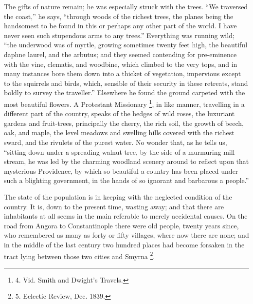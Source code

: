 The gifts of nature remain; he
was especially struck with the trees. ``We traversed the coast,'' he
says, ``through woods of the richest trees, the planes being the
handsomest to be found in this or perhaps any other part of the world.
I have never seen such stupendous arms to any trees.'' Everything was
running wild; ``the underwood was of myrtle, growing sometimes twenty
feet high, the beautiful daphne laurel, and the arbutus; and they
seemed contending for pre-eminence with the vine, clematis, and
woodbine, which climbed to the very tops, and in many instances bore
them down into a thicket of vegetation, impervious except to the
squirrels and birds, which, sensible of their security in these
retreats, stand boldly to survey the traveller.'' Elsewhere he found
the ground carpeted with the most beautiful flowers. A Protestant
Missionary \footnote{4.
Vid. Smith and Dwight's Travels.}, in like
manner, travelling in a different part of the country, speaks of the
hedges of wild roses, the luxuriant gardens and fruit-trees,
principally the cherry, the rich soil, the growth of beech, oak, and
maple, the level meadows and swelling hills covered with the richest
sward, and the rivulets of the purest water. No wonder that, as he
tells us, ``sitting down under a spreading walnut-tree, by the side of
a murmuring mill stream, he was led by the charming woodland scenery
around to reflect upon that mysterious Providence, by which so
beautiful a country has been placed under such a blighting
government, in the hands of so ignorant and barbarous a people.''

The state of the population is
in keeping with the neglected condition of the country. It is, down to
the present time, wasting away; and that there are inhabitants at all
seems in the main referable to merely accidental causes. On the road
from Angora to Constantinople there were old people, twenty years
since, who remembered as many as forty or fifty villages, where now
there are none; and in the middle of the last century two hundred
places had become forsaken in the tract lying between those two cities
and Smyrna \footnote{5.
Eclectic Review, Dec. 1839.}.

